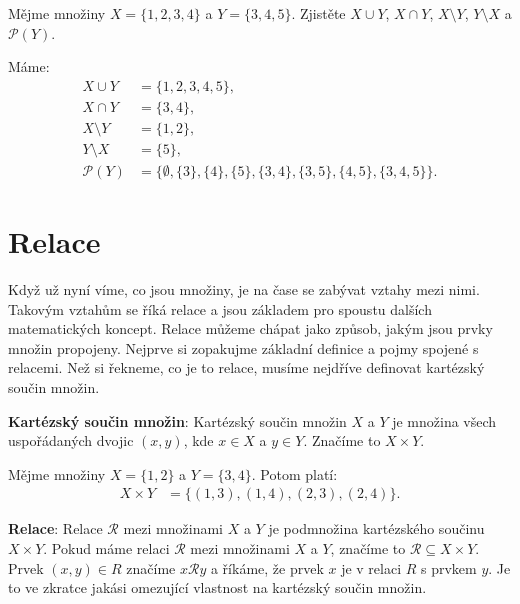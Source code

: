 \begin{problem}
  Mějme množiny $X = \{1, 2, 3, 4\}$ a $Y = \{3, 4, 5\}$. Zjistěte $X\cup Y$, $X\cap Y$, $X\setminus Y$, $Y\setminus X$ a $\mathcal{P}(Y)$.
\end{problem}

\begin{solution}
  Máme:
  \begin{align*}
    X\cup Y &= \{1, 2, 3, 4, 5\},\\
    X\cap Y &= \{3, 4\},\\
    X\setminus Y &= \{1, 2\},\\
    Y\setminus X &= \{5\},\\
    \mathcal{P}(Y) &= \{\emptyset, \{3\}, \{4\}, \{5\}, \{3, 4\}, \{3, 5\}, \{4, 5\}, \{3, 4, 5\}\}.
  \end{align*}
\end{solution}


\section{Relace}
Když už nyní víme, co jsou množiny, je na čase se zabývat vztahy mezi nimi. Takovým vztahům se říká relace a jsou základem pro spoustu dalších matematických koncept. Relace můžeme chápat jako způsob, jakým jsou prvky množin propojeny. Nejprve si zopakujme základní definice a pojmy spojené s relacemi. Než si řekneme, co je to relace, musíme nejdříve definovat kartézský součin množin.

\begin{definitionbox}
  \textbf{Kartézský součin množin}: Kartézský součin množin $X$ a $Y$ je množina všech uspořádaných dvojic $(x, y)$, kde $x\in X$ a $y\in Y$. Značíme to $X\times Y$. 
\end{definitionbox}

\begin{example}
  Mějme množiny $X = \{1, 2\}$ a $Y = \{3, 4\}$. Potom platí:
  \begin{align*}
    X\times Y &= \{(1, 3), (1, 4), (2, 3), (2, 4)\}.
  \end{align*}
\end{example}

\begin{definitionbox}
  \textbf{Relace}: Relace $\mathcal R$ mezi množinami $X$ a $Y$ je podmnožina kartézského součinu $X\times Y$. Pokud máme relaci $\mathcal R$ mezi množinami $X$ a $Y$, značíme to $\mathcal R\subseteq X\times Y$. Prvek $(x, y)\in R$ značíme $x\mathcal Ry$ a říkáme, že prvek $x$ je v relaci $R$ s prvkem $y$. Je to ve zkratce jakási omezující vlastnost na kartézský součin množin. 
\end{definitionbox}

